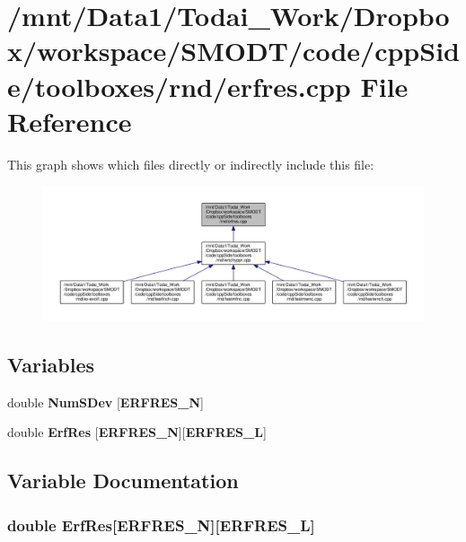 \section{/mnt/\-Data1/\-Todai\-\_\-\-Work/\-Dropbox/workspace/\-S\-M\-O\-D\-T/code/cpp\-Side/toolboxes/rnd/erfres.cpp File Reference}
\label{toolboxes_2rnd_2erfres_8cpp}
This graph shows which files directly or indirectly include this file\-:\nopagebreak
\begin{figure}[H]
\begin{center}
\leavevmode
\includegraphics[width=350pt]{toolboxes_2rnd_2erfres_8cpp__dep__incl}
\end{center}
\end{figure}
\subsection*{Variables}
\begin{DoxyCompactItemize}
\item 
double {\bf Num\-S\-Dev} [{\bf E\-R\-F\-R\-E\-S\-\_\-\-N}]
\item 
double {\bf Erf\-Res} [{\bf E\-R\-F\-R\-E\-S\-\_\-\-N}][{\bf E\-R\-F\-R\-E\-S\-\_\-\-L}]
\end{DoxyCompactItemize}


\subsection{Variable Documentation}
\subsubsection[{Erf\-Res}]{\setlength{\rightskip}{0pt plus 5cm}double Erf\-Res[{\bf E\-R\-F\-R\-E\-S\-\_\-\-N}][{\bf E\-R\-F\-R\-E\-S\-\_\-\-L}]}\label{toolboxes_2rnd_2erfres_8cpp_a532e3be570cd6f91d0e35bf278570579}


